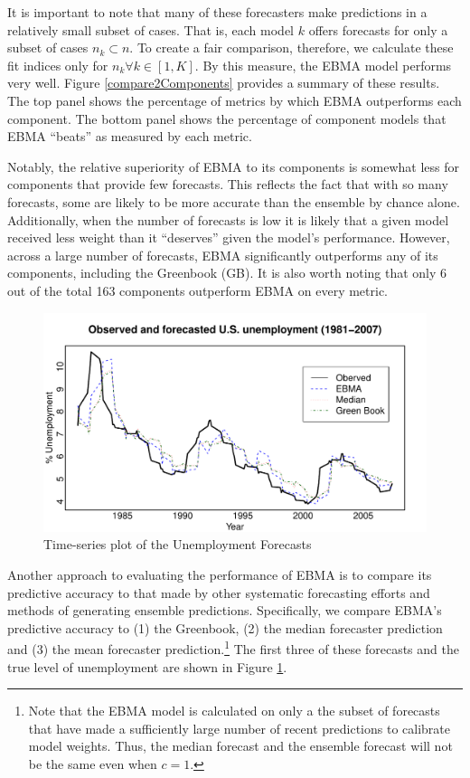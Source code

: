 \documentclass[12pt,fullpage,endnotes]{article}
\begin{document}
It is important to note that many of these forecasters make
predictions in a relatively small subset of cases.  That is, each
model $k$ offers forecasts for only a subset of cases $n_k \subset n$.
To create a fair comparison, therefore, we calculate these fit indices
only for $n_k \forall k \in [1,K]$.  By this measure, the EBMA model
performs very well.  Figure \ref{compare2Components} provides a
summary of these results.  The top panel shows the percentage of
metrics by which EBMA outperforms each component. The bottom panel
shows the percentage of component models that EBMA ``beats'' as
measured by each metric.

Notably, the relative superiority of EBMA to its components is
somewhat less for components that provide few forecasts.  This
reflects the fact that with so many forecasts, some are likely to be
more accurate than the ensemble by chance alone. Additionally, when the number of forecasts is low it is likely that a given model received less weight than it ``deserves'' given the model's performance. However, across a
large number of forecasts, EBMA significantly outperforms any of its
components, including the Greenbook (GB).  It is also worth noting
that only 6 out of the total 163 components outperform EBMA on every
metric.

\begin{figure}[h]
\caption{Time-series plot of the Unemployment Forecasts}
\label{timeSeries}
\begin{center}
\includegraphics[scale=.8]{timeSeries}
\end{center}
\end{figure}


Another approach to evaluating the performance of EBMA is to compare
its predictive accuracy to that made by other systematic forecasting
efforts and methods of generating ensemble predictions.  Specifically,
we compare EBMA's predictive accuracy to (1) the Greenbook, (2) the
median forecaster prediction and (3) the mean forecaster
prediction.\footnote{Note that the EBMA model is calculated on only a the
  subset of forecasts that have made a sufficiently large number of
  recent predictions to calibrate model weights.  Thus, the median
  forecast and the ensemble forecast will not be the same even when
  $c=1$.  }  The first three of these forecasts and the true level of
unemployment are shown in Figure \ref{timeSeries}.
\end{document}
